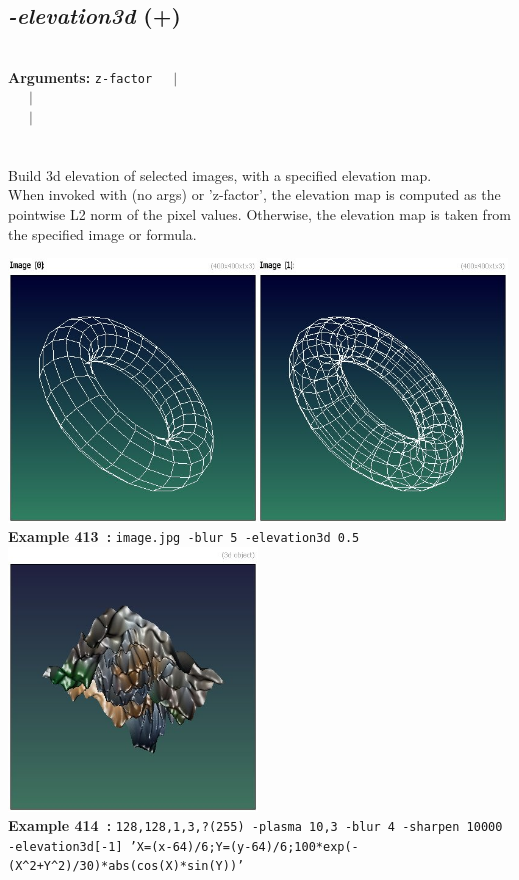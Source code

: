 \documentclass[a4paper,11pt,twoside]{book}
\begin{document}
\subsection{\emph{-elevation3d} (+)}\vspace*{-0.5em}
~\\\textbf{Arguments: } 
{\small \texttt{z-factor}}~~~$|$\\
~~~$|$\\
~~~$|$\\
\\~\\
Build 3d elevation of selected images, with a specified elevation map.
~\\When invoked with (no args) or 'z-factor', the elevation map is computed as the pointwise L2 norm of the
pixel values. Otherwise, the elevation map is taken from the specified image or formula.
\begin{center}\includegraphics[keepaspectratio=true,height=7cm,width=\textwidth]{img/gmic_def413.jpg}\\
{\footnotesize \textbf{Example 413~:} \texttt{image.jpg -blur 5 -elevation3d 0.5}}
\\\includegraphics[keepaspectratio=true,height=7cm,width=\textwidth]{img/gmic_def414.jpg}\\
{\footnotesize \textbf{Example 414~:} \texttt{128,128,1,3,?(255) -plasma 10,3 -blur 4 -sharpen 10000 -elevation3d[-1] 'X=(x-64)/6;Y=(y-64)/6;100*exp(-(X\textasciicircum 2+Y\textasciicircum 2)/30)*abs(cos(X)*sin(Y))'}}
\end{center}
\end{document}
